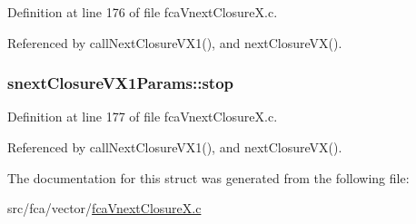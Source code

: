 \-Definition at line 176 of file fca\-Vnext\-Closure\-X.\-c.



\-Referenced by call\-Next\-Closure\-V\-X1(), and next\-Closure\-V\-X().

\hypertarget{structsnextClosureVX1Params_a4ebb2a834d87fa4bed2bb7597ac29d23}{
\subsubsection[{stop}]{ {\bf snext\-Closure\-V\-X1\-Params\-::stop}}}\label{structsnextClosureVX1Params_a4ebb2a834d87fa4bed2bb7597ac29d23}


\-Definition at line 177 of file fca\-Vnext\-Closure\-X.\-c.



\-Referenced by call\-Next\-Closure\-V\-X1(), and next\-Closure\-V\-X().



\-The documentation for this struct was generated from the following file\-:\begin{DoxyCompactItemize}
\item 
src/fca/vector/\hyperlink{fcaVnextClosureX_8c}{fca\-Vnext\-Closure\-X.\-c}\end{DoxyCompactItemize}
